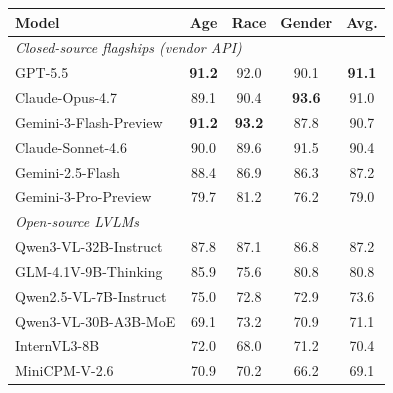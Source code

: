 \documentclass[lettersize,journal]{IEEEtran}
\begin{document}
\begin{table}[!t]
\centering
\footnotesize
\renewcommand\arraystretch{1.15}
\begin{tabular}{l|cccc}
\hline
\textbf{Model} & \textbf{Age} & \textbf{Race} & \textbf{Gender} & \textbf{Avg.} \\
\hline
\multicolumn{5}{l}{\textit{Closed-source flagships (vendor API)}}\\
\hline
GPT-5.5~\cite{openai_gpt55}                   & \cellcolor{green!30}\textbf{91.2} & \cellcolor{green!30}92.0 & \cellcolor{green!30}90.1 & \cellcolor{green!30}\textbf{91.1} \\
Claude-Opus-4.7                               & \cellcolor{green!30}89.1 & \cellcolor{green!30}90.4 & \cellcolor{green!30}\textbf{93.6} & \cellcolor{green!30}91.0 \\
Gemini-3-Flash-Preview~\cite{gemini3}         & \cellcolor{green!30}\textbf{91.2} & \cellcolor{green!30}\textbf{93.2} & \cellcolor{green!15}87.8 & \cellcolor{green!30}90.7 \\
Claude-Sonnet-4.6                             & \cellcolor{green!30}90.0 & \cellcolor{green!30}89.6 & \cellcolor{green!30}91.5 & \cellcolor{green!30}90.4 \\
Gemini-2.5-Flash                              & \cellcolor{green!15}88.4 & \cellcolor{green!15}86.9 & \cellcolor{green!15}86.3 & \cellcolor{green!15}87.2 \\
Gemini-3-Pro-Preview                          & 79.7 & \cellcolor{green!15}81.2 & 76.2 & 79.0 \\
\hline
\multicolumn{5}{l}{\textit{Open-source LVLMs}}\\
\hline
Qwen3-VL-32B-Instruct~\cite{qwen3vl}          & \cellcolor{green!15}87.8 & \cellcolor{green!15}87.1 & \cellcolor{green!15}86.8 & \cellcolor{green!15}87.2 \\
GLM-4.1V-9B-Thinking~\cite{glm41v}            & \cellcolor{green!15}85.9 & 75.6 & \cellcolor{green!15}80.8 & \cellcolor{green!15}80.8 \\
Qwen2.5-VL-7B-Instruct                        & 75.0 & 72.8 & 72.9 & 73.6 \\
Qwen3-VL-30B-A3B-MoE                          & \cellcolor{red!15}69.1 & 73.2 & 70.9 & 71.1 \\
InternVL3-8B~\cite{internvl3}                 & 72.0 & \cellcolor{red!15}68.0 & 71.2 & 70.4 \\
MiniCPM-V-2.6                                 & 70.9 & 70.2 & \cellcolor{red!15}66.2 & \cellcolor{red!15}69.1 \\

\end{tabular}
\end{table}
\end{document}
